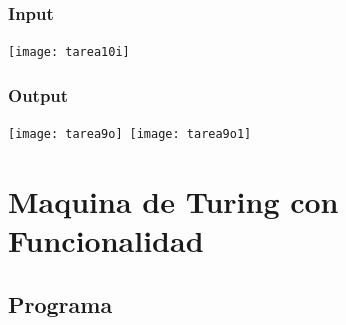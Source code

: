 \documentclass[11pt,a4paper]{report}
\begin{document}
			\subsection{Input}
\texttt{[image: tarea10i]}\
			\subsection{Output}
\texttt{[image: tarea9o]}\
\texttt{[image: tarea9o1]}\
	\chapter{Maquina de Turing con Funcionalidad  }
		\section{Programa}
\end{document}
